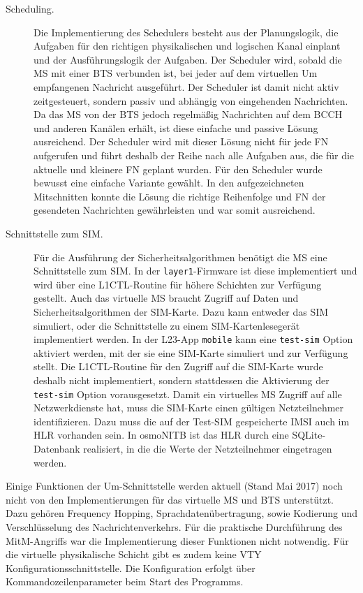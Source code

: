 \begin{description}
\item[Scheduling.] Die Implementierung des Schedulers besteht aus der Planungslogik, die Aufgaben für den richtigen physikalischen und logischen Kanal einplant und der Ausführungslogik der Aufgaben. Der Scheduler wird, sobald die \ac{MS} mit einer \ac{BTS} verbunden ist, bei jeder auf dem virtuellen \ac{Um} empfangenen Nachricht ausgeführt. Der Scheduler ist damit nicht aktiv zeitgesteuert, sondern passiv und abhängig von eingehenden Nachrichten. Da das \ac{MS} von der \ac{BTS} jedoch regelmäßig Nachrichten auf dem \ac{BCCH} und anderen Kanälen erhält, ist diese einfache und passive Lösung ausreichend. Der Scheduler wird mit dieser Lösung nicht für jede \ac{FN} aufgerufen und führt deshalb der Reihe nach alle Aufgaben aus, die für die aktuelle und kleinere \ac{FN} geplant wurden. Für den Scheduler wurde bewusst eine einfache Variante gewählt. In den aufgezeichneten Mitschnitten konnte die Lösung die richtige Reihenfolge und \ac{FN} der gesendeten Nachrichten gewährleisten und war somit ausreichend.
\item[Schnittstelle zum \ac{SIM}.] Für die Ausführung der Sicherheitsalgorithmen benötigt die \ac{MS} eine Schnittstelle zum \ac{SIM}. In der \texttt{layer1}-Firmware ist diese implementiert und wird über eine \ac{L1CTL}-Routine für höhere Schichten zur Verfügung gestellt. Auch das virtuelle \ac{MS} braucht Zugriff auf Daten und Sicherheitsalgorithmen der \ac{SIM}-Karte. Dazu kann entweder das \ac{SIM} simuliert, oder die Schnittstelle zu einem \ac{SIM}-Kartenlesegerät implementiert werden. In der L23-App \texttt{mobile} kann eine \texttt{test-sim} Option aktiviert werden, mit der sie eine \ac{SIM}-Karte simuliert und zur Verfügung stellt. Die \ac{L1CTL}-Routine für den Zugriff auf die \ac{SIM}-Karte wurde deshalb nicht implementiert, sondern stattdessen die Aktivierung der \texttt{test-sim} Option vorausgesetzt. Damit ein virtuelles \ac{MS} Zugriff auf alle Netzwerkdienste hat, muss die \ac{SIM}-Karte einen gültigen Netzteilnehmer identifizieren. Dazu muss die auf der Test-\ac{SIM} gespeicherte \ac{IMSI} auch im \ac{HLR} vorhanden sein. In osmoNITB ist das \ac{HLR} durch eine SQLite-Datenbank realisiert, in die die Werte der Netzteilnehmer eingetragen werden.
\end{description}

Einige Funktionen der \ac{Um}-Schnittstelle werden aktuell (Stand Mai 2017) noch nicht von den Implementierungen für das virtuelle \ac{MS} und \ac{BTS} unterstützt. Dazu gehören Frequency Hopping, Sprachdatenübertragung, sowie Kodierung und Verschlüsselung des Nachrichtenverkehrs. Für die praktische Durchführung des \ac{MitM}-Angriffs war die Implementierung dieser Funktionen nicht notwendig. Für die virtuelle physikalische Schicht gibt es zudem keine \ac{VTY} Konfigurationsschnittstelle. Die Konfiguration erfolgt über Kommandozeilenparameter beim Start des Programms.

